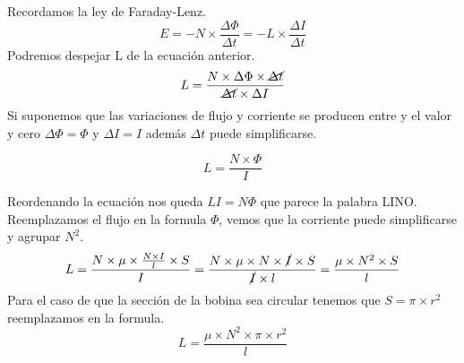 \documentclass[../main]{subfiles}
\begin{document}
Recordamos la ley de Faraday-Lenz.
\begin{equation}
    E=-N \times \dfrac{\Delta \Phi}{\Delta t}= -L \times \dfrac{\Delta I}{\Delta t}
\end{equation}
Podremos despejar L de la ecuación anterior.
\begin{equation}
    L=\dfrac{N \times \Delta \Phi \times \cancel{\Delta t}}{\cancel{\Delta t} \times \Delta I }
\end{equation}
Si suponemos que las variaciones de flujo y corriente se producen entre y el valor y cero $\Delta \Phi = \Phi$ y $\Delta I = I$ además $\Delta t$ puede simplificarse.

\begin{equation}
    L=\dfrac{N \times  \Phi }{ I }
\end{equation}

Reordenando la ecuación nos queda $LI=N\Phi$ que parece la palabra LINO. Reemplazamos el flujo en la formula $\Phi$, vemos que la corriente puede simplificarse y agrupar $N^2$.
\begin{equation}
    L=\dfrac{N \times   \mu \times \frac{N \times I}{l} \times S  }{ I }=\dfrac{N \times   \mu \times N \times \cancel{I} \times S  }{ \cancel{I} \times l }=\dfrac{   \mu \times N^2  \times S  }{  l}
\end{equation}
Para el caso de que la sección de la bobina sea circular tenemos que $S=\pi \times r^2$ reemplazamos en la formula.
\begin{equation}
    L=\dfrac{   \mu \times N^2  \times \pi \times r^2  }{  l} 
\end{equation}










\end{document}
